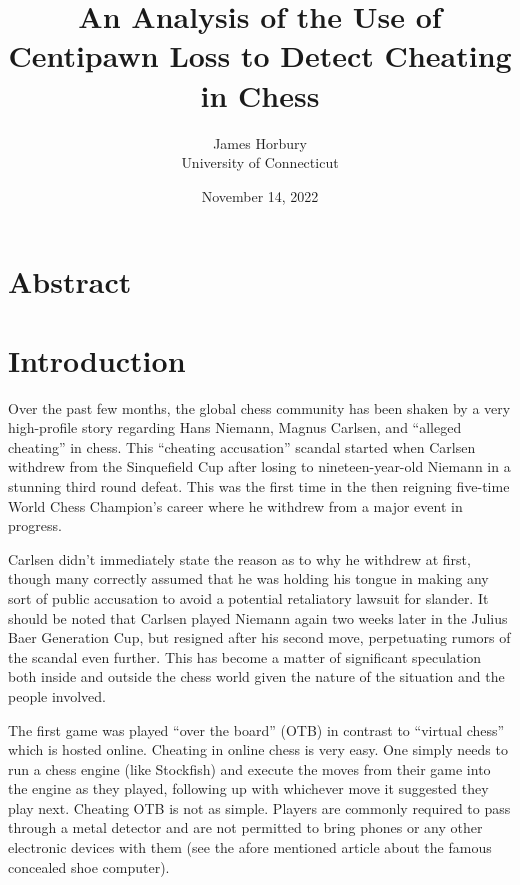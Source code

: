 \documentclass[12pt]{article}
\title{An Analysis of the Use of Centipawn Loss to Detect Cheating in Chess}
\author{James Horbury\\
    University of Connecticut
}
\date{November 14, 2022}
\begin{document}
\maketitle

\section*{Abstract}
\label{sec:abs}


\section*{Introduction}
\label{sec:intro}

Over the past few months, the global chess community has been shaken by a very high-profile story regarding Hans Niemann, Magnus Carlsen, and “alleged cheating” in chess. This “cheating accusation” scandal started when Carlsen withdrew from the Sinquefield Cup after losing to nineteen-year-old Niemann in a stunning third round defeat. This was the first time in the then reigning five-time World Chess Champion's career where he withdrew from a major event in progress.

Carlsen didn't immediately state the reason as to why he withdrew at first, though many correctly assumed that he was holding his tongue in making any sort of public accusation to avoid a potential retaliatory lawsuit for slander. It should be noted that Carlsen played Niemann again two weeks later in the Julius Baer Generation Cup, but resigned after his second move, perpetuating rumors of the scandal even further. This has become a matter of significant speculation both inside and outside the chess world given the nature of the situation and the people involved. 

The first game was played “over the board” (OTB) in contrast to “virtual chess” which is hosted online. Cheating in online chess is very easy. One simply needs to run a chess engine (like Stockfish) and execute the moves from their game into the engine as they played, following up with whichever move it suggested they play next. Cheating OTB is not as simple. Players are commonly required to pass through a metal detector and are not permitted to bring phones or any other electronic devices with them (see the afore mentioned article about the famous concealed shoe computer).
\end{document}
